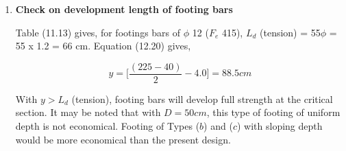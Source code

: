 \begin{enumerate}
Table 19 of the Code gives,
$$\sage{tau_c}=0.32N/mm^2$$
$$K = 1.0$$
        $$\sage{tau_a}=\sage{tau_c}=0.032kN/cm^2$$
$$\sage{tau_v}=\sage{tau_a}, D = 50cm \text{ is safe}$$

\item  \textbf{Check on development length of footing bars}

Table (11.13) gives, for footings bars of $\phi$ 12 ($F_e$ 415),
$L_d$ (tension) = 55$\phi$ = 55 x 1.2 = 66 cm.
Equation (12.20) gives, 

$$y=\bigg[\frac{(225-40)}{2}-4.0\bigg]=88.5cm$$

With $y > L_d$ (tension), footing bars will develop full strength at the critical section. 
It may be noted that with $D = 50 cm$, this type of footing of uniform depth is not economical. 
Footing of Types ($b$) and ($c$) with sloping depth would be more economical than the present design.
\end{enumerate} 


